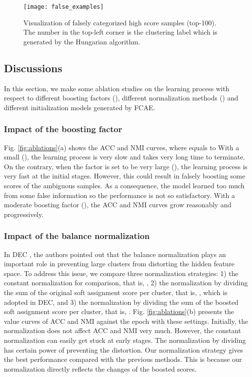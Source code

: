 \documentclass[preprint,12pt]{elsarticle}
\begin{document}
\begin{figure}[!htb]
\centering
\texttt{[image: false\_examples]}
\caption{Visualization of falsely categorized high score samples (top-100).
The number in the top-left corner is the clustering label which is generated by the Hungarian algorithm.
}\label{fig:vis-false}
\end{figure}


\subsection{Discussions}

In this section, we make some ablation studies on the learning process with respect to different boosting
factors (), different normalization methods () and different initialization models generated by FCAE.

\subsubsection{Impact of the boosting factor }

Fig. \ref{fig:ablations}(a) shows the ACC and NMI curves, where  equals to  With a small 
(), the learning process is very slow and takes very long time to terminate. On the contrary,
when the factor is set to be very large (), the learning process is very fast at the initial stages.
However, this could result in falsely boosting some scores of the ambiguous samples. As a consequence,
the model learned too much from some false information so the performance is not so satisfactory.
With a moderate boosting factor (), the ACC and NMI curves grow reasonably and progressively.

\subsubsection{Impact of the balance normalization}

In DEC \cite{Xie2015DEC}, the authors pointed out that the balance normalization plays an important role in preventing
large clusters from distorting the hidden feature space. To address this issue, we compare three normalization strategies:
1) the constant normalization for comparison, that is, , 2) the normalization by dividing the sum of the original
soft assignment score per cluster, that is, , which is adopted in DEC, and 3) the normalization by
dividing the sum of the boosted soft assignment score per cluster, that is, .
Fig. \ref{fig:ablations}(b) presents the value curves of ACC and NMI against the epoch with these settings.
Initially, the normalization does not affect ACC and NMI very much. However, the constant normalization can easily
get stuck at early stages. The normalization by dividing  has certain power of preventing
the distortion. Our normalization strategy gives the best performance compared with the previous methods.
This is because our normalization directly reflects the changes of the boosted scores.
\end{document}
